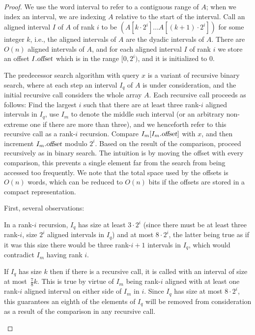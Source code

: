 \def\offset{\text{\sl offset}}
\begin{proof}
We use the word interval to refer to a contiguous range of $A$; when we index an interval, we are indexing $A$ relative to the start of the interval.
%
Call an aligned interval $I$ of $A$ of rank $i$ to be $( A[k\cdot 2^i]\ldots A[(k+1) \cdot 2^i])$ for some integer $k$, i.e., the aligned intervals of $A$ are the dyadic intervals of $A$. There are $O(n)$ aligned intervals of $A$, and for each aligned interval $I$ of rank $i$ we store an offset $I.\offset$ which is in the range $[0,2^i)$, and it is initialized to 0.

The predecessor search algorithm with query $x$ is a variant of recursive binary search, where at each step an interval $I_q$ of $A$ is under consideration, and the initial recursive call considers the whole array $A$. Each recursive call proceeds as follows: Find the largest $i$ such that there are at least three rank-$i$ aligned intervals in $I_q$, use $I_m$ to denote  the middle such interval (or an arbitrary non-extreme one if there are more than three), and we henceforth refer to this recursive call as a rank-$i$ recursion. Compare $I_m[I_m.\offset]$ with $x$, and then increment $I_m.\offset$ modulo $2^i$. Based on the result of the comparison, proceed recursively as in binary search.
The intuition is by moving the offset with every comparison, this prevents a single element far from the search from being accessed too frequently.
We note that the total space used by the offsets is $O(n)$ words, which can be reduced to $O(n)$ bits if the offsets are stored in a compact representation.

\pagebreak[3]
\noindent First, several observations:\nopagebreak
%
\begin{compactenum}
\item \label{p1} In a rank-$i$ recursion, $I_q$ has size at least $3 \cdot 2^i$ (since there must be at least three rank-$i$, size $2^i$ aligned intervals in $I_q$) and at most $8 \cdot 2^i$, the latter being true as if it was this size there would be three rank-$i+1$ intervals in $I_q$, which would contradict $I_m$ having rank $i$. 

\item If $I_q$ has size $k$ then if there is a recursive call, it is called with an interval of size at most~$\frac{7}{8}k$. This is true by virtue of $I_m$ being rank-$i$ aligned with at least one rank-$i$ aligned interval on either side of $I_m$ in $i$. Since $I_q$ has size at most $8\cdot 2^i$, this guarantees an eighth of the elements of $I_q$ will be removed from consideration as a result of the comparison in any recursive call.


\end{compactenum}
\end{proof}
